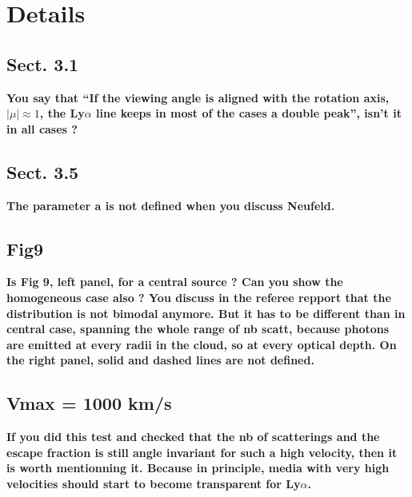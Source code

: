 \documentclass[12pt]{article}
\begin{document}
\section*{Details}

\subsection*{Sect. 3.1}

{\bf You say that “If the viewing angle is aligned with the rotation axis, $|\mu| \approx 1$, the Ly$\alpha$ line keeps in most of the cases a double peak”, isn’t it in all cases ?}

\subsection*{Sect. 3.5}
{\bf The parameter a is not defined when you discuss Neufeld.} 

\subsection*{Fig9}

{\bf Is Fig 9, left panel, for a central source ? Can you show the homogeneous case also ? You discuss in the referee repport that the distribution is not bimodal anymore. But it has to be different than in central case, spanning the whole range of nb scatt, because photons are emitted at every radii in the cloud, so at every optical depth.
On the right panel, solid and dashed lines are not defined.} 

\subsection*{Vmax = 1000 km/s}
{\bf If you did this test and checked that the nb of scatterings and the escape fraction is still angle invariant for such a high velocity, then it is worth mentionning it. Because in principle, media with very high velocities should start to become transparent for Ly$\alpha$.} 
\end{document}
